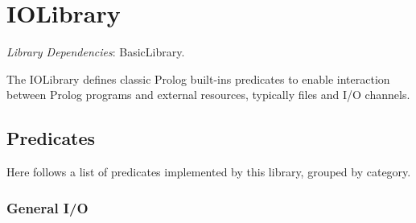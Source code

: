 \section{IOLibrary}
\label{sec:io-library}

\noindent \emph{Library Dependencies}: BasicLibrary.

The IOLibrary defines classic Prolog built-ins predicates to enable
interaction between Prolog programs and external resources, typically
files and I/O channels.

\subsection{Predicates}

\noindent Here follows a list of predicates implemented by this
library, grouped by category.

\subsubsection{General I/O}

